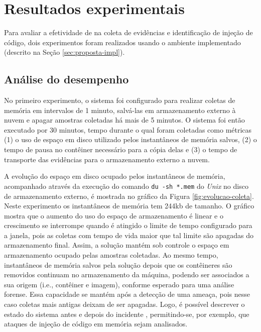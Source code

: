 \section{Resultados experimentais}
\label{sec:proposta-exp}

Para avaliar a efetividade de \fancyname na coleta de evidências e identificação de injeção de código, dois experimentos foram realizados usando o ambiente implementado (descrito na Seção \ref{sec:proposta-impl}).
%


\subsection{Análise do desempenho}
\label{sec:proposta-exp-desempenho}

No primeiro experimento, o sistema foi configurado para realizar coletas de memória em intervalos de 1 minuto, salvá-las em armazenamento externo à nuvem e apagar amostras coletadas há mais de 5 minutos. 
%
O sistema foi então executado por 30 minutos, tempo durante o qual foram coletadas como métricas (1) o uso de espaço em disco utilizado pelos instantâneos de memória salvos, (2) o tempo de pausa no contêiner necessário para a cópia delas e (3) o tempo de transporte das evidências para o armazenamento externo a nuvem.


A evolução do espaço em disco ocupado pelos instantâneos de memória, acompanhado através da execução do comando \texttt{du -sh *.mem} do \textit{Unix} no disco de armazenamento externo, é mostrada no gráfico da Figura \ref{fig:evolucao-coleta}.
%
Neste experimento os instantâneos de memória tem 244kb de tamanho. 
%
O gráfico mostra que o aumento do uso do espaço de armazenamento é linear e o crescimento se interrompe quando é atingido o limite de tempo configurado para a janela, pois as coletas com tempo de vida maior que tal limite são apagadas do armazenamento final. 
%
Assim, a solução mantém sob controle o espaço em armazenamento ocupado pelas amostras coletadas.
%
Ao mesmo tempo, instantâneos de memória salvos pela solução depois que os contêineres são removidos continuam no armazenamento da máquina, podendo ser associados a sua origem (i.e., contêiner e imagem), conforme esperado para uma análise forense.
%
Essa capacidade se mantém após a detecção de uma ameaça, pois nesse caso coletas mais antigas deixam de ser apagadas.
%
Logo, é possível descrever o estado do sistema antes e depois do incidente \cite{CaseMemoryForensics:2014}, permitindo-se, por exemplo, que ataques de injeção de código em memória sejam analisados.



